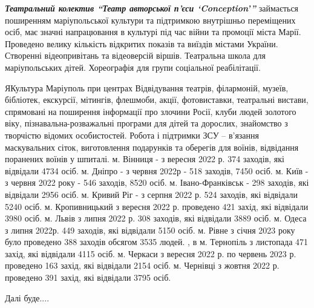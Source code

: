 \emph{\color{blue}\bfseries Театральний колектив  \enquote{Театр авторської п'єси \enquote{Conception}}} займається
поширенням маріупольської культури та підтримкою внутрішньо переміщених осіб,
має значні напрацювання  в культурі під час війни та промоції  міста Марії.
Проведено велику кількість відкритих показів та виїздів містами України.
Створенні відеопривітань та відеоверсій віршів. Театральна школа для
маріупольських дітей. Хореографія для групи соціальної реабілітації. 

ЯКультура Маріуполь при центрах Відвідування театрів, філармоній, музеїв,
бібліотек, екскурсії, мітингів, флешмоби, акції, фотовиставки, театральні
вистави, спрямовані на поширення  інформації про злочини Росії, клуби людей
золотого віку, пізнавальна-розважальні програми для дітей та дорослих,
знайомство з творчістю відомих особистостей. Робота і підтримки ЗСУ – в'язання
маскувальних сіток,  виготовлення подарунків та оберегів для воїнів, відвідання
поранених воїнів у шпиталі. м. Вінниця - з вересня  2022 р.  374 заходів, які
відвідали 4734 осіб.  м. Дніпро - з червня 2022р - 518 заходів, 7450 осіб. м.
Київ - з червня 2022 року -  546 заходів, 8520 осіб. м. Івано-Франківськ -  298
заходів, які відвідали 2956 осіб. м. Кривий Ріг - з серпня 2022 р. 524 заходів,
які відвідали 5240 осіб. м. Кропивницький  з вересня 2022 р. проведено 421
захід, які відвідали 3980 осіб. м. Львів з липня 2022 р. 308 заходів, які
відвідали 3889 осіб. м. Одеса з липня 2022р. 449 заходів, які відвідали 5150
осіб. м. Рівне з  січня 2023 року було проведено 388 заходів  обсягом 3535
людей. , в м. Тернопіль з листопада  471 захід, які відвідали 4115 осіб.  м.
Черкаси з вересня 2022 р. по червень 2023 р. проведено 163 захід, які відвідали
2154 осіб. м. Чернівці з  жовтня 2022 р.  проведено 391 захід, які відвідали
3795 осіб.

Далі буде....
